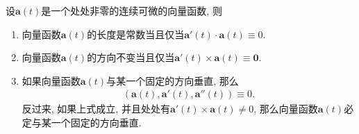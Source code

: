 \documentclass[../../main.tex]{subfiles}%
\begin{document}
\begin{theorem}
设$\bm{a}(t)$是一个处处非零的连续可微的向量函数, 则
\begin{enumerate}[(1)]
\item 向量函数$\bm{a}(t)$的长度是常数当且仅当$\bm{a}'(t)\cdot\bm{a}(t)\equiv 0$.
\item 向量函数$\bm{a}(t)$的方向不变当且仅当$\bm{a}'(t)\times\bm{a}(t)\equiv \bm{0}$.
\item 如果向量函数$\bm{a}(t)$与某一个固定的方向垂直, 那么
\begin{align*}
(\bm{a}(t),\bm{a}'(t),\bm{a}''(t))\equiv 0.
\end{align*}
反过来, 如果上式成立, 并且处处有$\bm{a}'(t)\times\bm{a}(t)\neq 0$, 那么向量函数$\bm{a}(t)$必定与某一个固定的方向垂直.
\end{enumerate}
\end{theorem}
\end{document}

